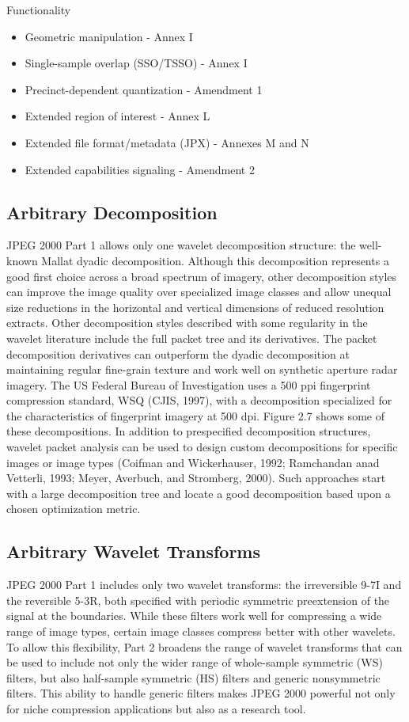 Functionality
\begin{itemize} 
    \item Geometric manipulation - Annex I
    \item Single-sample overlap (SSO/TSSO) - Annex I
    \item Precinct-dependent quantization - Amendment 1
    \item Extended region of interest - Annex L
    \item Extended file format/metadata (JPX) - Annexes M and N
    \item Extended capabilities signaling - Amendment 2
\end{itemize}

\subsection{Arbitrary Decomposition}

JPEG 2000 Part 1 allows only one wavelet decomposition structure: the well-known
Mallat dyadic decomposition. Although this decomposition represents a good first choice
across a broad spectrum of imagery, other decomposition styles can improve the image
quality over specialized image classes and allow unequal size reductions in the horizontal
and vertical dimensions of reduced resolution extracts.
Other decomposition styles described with some regularity in the wavelet literature
include the full packet tree and its derivatives. The packet decomposition derivatives can
outperform the dyadic decomposition at maintaining regular fine-grain texture and work
well on synthetic aperture radar imagery. The US Federal Bureau of Investigation uses
a 500 ppi fingerprint compression standard, WSQ (CJIS, 1997), with a decomposition
specialized for the characteristics of fingerprint imagery at 500 dpi. Figure 2.7 shows
some of these decompositions.
In addition to prespecified decomposition structures, wavelet packet analysis can be
used to design custom decompositions for specific images or image types (Coifman and
Wickerhauser, 1992; Ramchandan anad Vetterli, 1993; Meyer, Averbuch, and Stromberg,
2000). Such approaches start with a large decomposition tree and locate a good decomposition
based upon a chosen optimization metric.

\subsection{Arbitrary Wavelet Transforms}

JPEG 2000 Part 1 includes only two wavelet transforms: the irreversible 9-7I and the
reversible 5-3R, both specified with periodic symmetric preextension of the signal at
the boundaries. While these filters work well for compressing a wide range of image
types, certain image classes compress better with other wavelets. To allow this flexibility,
Part 2 broadens the range of wavelet transforms that can be used to include not only the
wider range of whole-sample symmetric (WS) filters, but also half-sample symmetric (HS)
filters and generic nonsymmetric filters. This ability to handle generic filters makes JPEG
2000 powerful not only for niche compression applications but also as a research tool. \cite{jpeg_suite}


